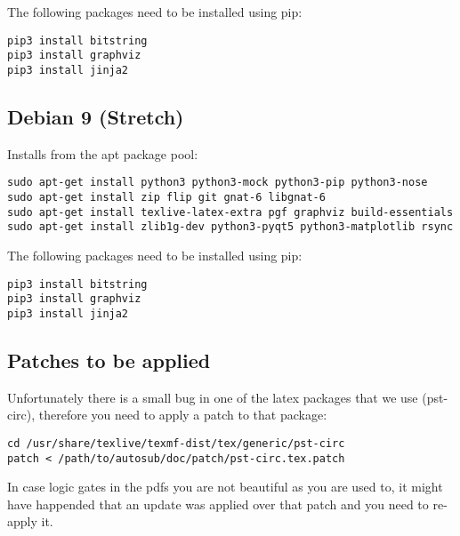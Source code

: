 The following packages need to be installed using pip:

\begin{verbatim}
pip3 install bitstring
pip3 install graphviz
pip3 install jinja2
\end{verbatim}


\subsection{Debian 9 (Stretch)}

Installs from the apt package pool:

\begin{verbatim}
sudo apt-get install python3 python3-mock python3-pip python3-nose
sudo apt-get install zip flip git gnat-6 libgnat-6
sudo apt-get install texlive-latex-extra pgf graphviz build-essentials
sudo apt-get install zlib1g-dev python3-pyqt5 python3-matplotlib rsync
\end{verbatim}

The following packages need to be installed using pip:

\begin{verbatim}
pip3 install bitstring
pip3 install graphviz
pip3 install jinja2
\end{verbatim}


\subsection{Patches to be applied}
Unfortunately there is a small bug in one of the latex packages that we use
(pst-circ), therefore you need to apply a patch to that package:

\begin{verbatim}
cd /usr/share/texlive/texmf-dist/tex/generic/pst-circ
patch < /path/to/autosub/doc/patch/pst-circ.tex.patch
\end{verbatim}

In case logic gates in the pdfs you are not beautiful as you are used to, it might have
happended that an update was applied over that patch and you need to re-apply it.
